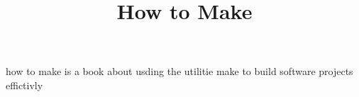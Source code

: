 \documentclass{book}
\title{How to Make}
\begin{document}
\maketitle
\tableofcontent
how to make is a book about usding the utilitie make to build software projects
effictivly \newline
 
\end{document}
